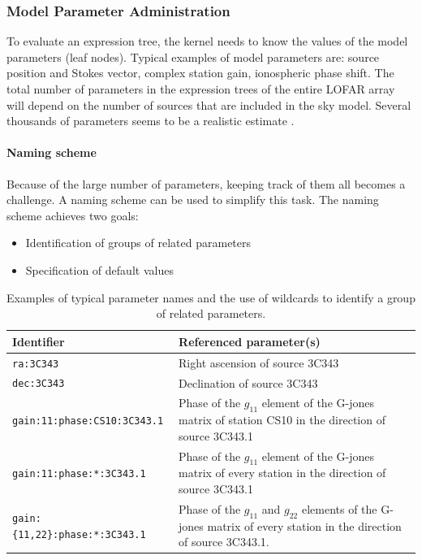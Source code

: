 \documentclass[10pt]{lofar}
\begin{document}
\subsubsection{Model Parameter Administration}
\label{subsubsec:admin-model-parms}

To evaluate an expression tree, the kernel needs to know the values of the model
parameters (leaf nodes). Typical examples of model parameters are: source
position and Stokes vector, complex station gain, ionospheric phase shift. The
total number of parameters in the expression trees of the entire LOFAR array
will depend on the number of sources that are included in the sky model. Several
thousands of parameters seems to be a realistic estimate
\cite{LOFAR-ASTRON-ADD-015}.

\paragraph{Naming scheme}
Because of the large number of parameters, keeping track of them all becomes a
challenge. A naming scheme can be used to simplify this task. The naming scheme
achieves two goals:
\begin{itemize}
\item Identification of groups of related parameters
\item Specification of default values
\end{itemize}

\begin{table}[htb!]
\centering
\begin{tabular}{lp{}}
\hline
\textbf{Identifier} & \textbf{Referenced parameter(s)} \\
\hline
\texttt{ra:3C343} & Right ascension of source 3C343 \\
\hline
\texttt{dec:3C343} & Declination of source 3C343 \\
\hline
\texttt{gain:11:phase:CS10:3C343.1} & Phase of the $g_{11}$ element of the
G-jones matrix of station CS10 in the direction of source 3C343.1 \\
\hline
\texttt{gain:11:phase:*:3C343.1} & Phase of the $g_{11}$ element of the G-jones
matrix of every station in the direction of source 3C343.1 \\
\hline
\texttt{gain:\{11,22\}:phase:*:3C343.1} & Phase of the $g_{11}$ and $g_{22}$
elements of the G-jones matrix of every station in the direction of source 3C343.1. \\
\hline
\end{tabular}
\caption{Examples of typical parameter names and the use of wildcards to
identify a group of related parameters.}
\label{tab:naming_scheme}
\end{table}
\end{document}
